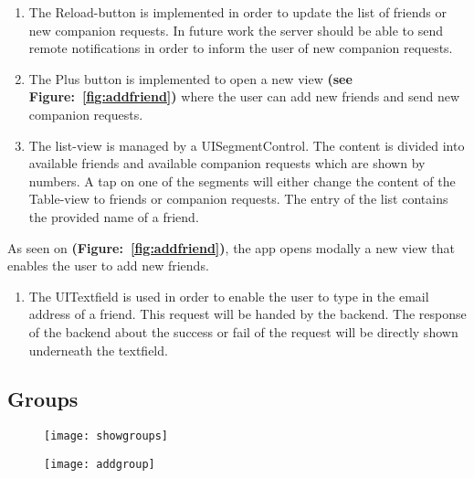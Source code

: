 \begin{enumerate}
\item The Reload-button is implemented in order to update the list of friends or new companion requests. In future work the server should be able to send remote notifications in order to inform the user of new companion requests.

\item The Plus button is implemented to open a new view \textbf{(see Figure:~\ref{fig:addfriend})} where the user can add new friends and send new companion requests.

\item The list-view is managed by a UISegmentControl. The content is divided into available friends and available companion requests which are shown by numbers. A tap on one of the segments will either change the content of the Table-view to friends or companion requests. The entry of the list contains the provided name of a friend.
\end{enumerate}


As seen on \textbf{(Figure:~\ref{fig:addfriend})}, the app opens modally a new view that enables the user to add new friends.

\begin{enumerate}
\item The UITextfield is used in order to enable the user to type in the email address of a friend. This request will be handed by the backend. The response of the backend about the success or fail of the request will be directly shown underneath the textfield.
\end{enumerate}

\subsection{Groups}

\begin{figure}
\centering
\begin{minipage}{.5\textwidth}
  \centering
  \texttt{[image: showgroups]}
  \label{fig:showgroups}
\end{minipage}%
\begin{minipage}{.5\textwidth}
  \centering
  \texttt{[image: addgroup]}
  \label{fig:addgroup}
\end{minipage}
\end{figure}

